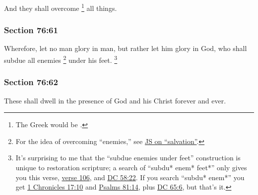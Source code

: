 		And they shall overcome%
			\footnote{%
				The Greek would be \hyperref[NIKAO]{}.
				}
		all things.


	\subsubsection{Section 76:61} %
		\label{DC76-61}

		Wherefore, let no man glory in man, but rather let him glory in God, who shall subdue all enemies%
			\footnote{%
				For the idea of overcoming ``enemies,'' see \hyperref[SALVATION-JS]{JS on ``salvation''}.
				}
		under his feet.%
			\footnote{%
				It's surprising to me that the ``subdue enemies under feet'' construction is unique to restoration scripture; a search of ``subdu* enem* feet*'' only gives you this verse, \hyperref[DC76-106]{verse 106}, and \hyperref[DC58-22]{DC 58:22}. If you search ``subdu* enem*'' you get \hyperref[1CHRONICLES-17-10]{1 Chronicles 17:10} and \hyperref[PSALMS-81-14]{Psalms 81:14}, plus \hyperref[DC65-6]{DC 65:6}, but that's it. 
				}


	\subsubsection{Section 76:62} %
		\label{DC76-62}

		These shall dwell in the presence of God and his Christ forever and ever.


